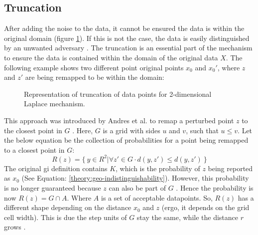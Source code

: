 \subsection{Truncation} \label{theory:truncation}
After adding the noise to the data, it cannot be ensured the data is within the original domain (figure \ref{figure:truncation-2d}).
If this is not the case, the data is easily distinguished by an unwanted adversary \citep{DBLP:journals/corr/abs-1212-1984,9646489}.
The truncation is an essential part of the mechanism to ensure the data is contained within the domain of the original data $X$. The following example shows two different point original points $x_0$ and $x_0'$, where $z$ and $z'$ are being remapped to be within the domain:
\begin{figure}[H]
\centering
  
  \caption{Representation of truncation of data points for 2-dimensional Laplace mechanism.}
  \label{figure:truncation-2d}
\end{figure}
This approach was introduced by Andres et al. to remap a perturbed point $z$ to the closest point in $G$ \citep{DBLP:journals/corr/abs-1212-1984}.
Here, $G$ is a grid with sides $u$ and $v$, such that $u \leq v$.
Let the below equation be the collection of probabilities for a point being remapped to a closest point in $G$:
\begin{equation}
  R(z) = \{ \ y \in R^2 | \forall z' \in G \cdot d(y, z') \leq d(y, z') \ \}
  \label{eq:grid-probability}
\end{equation}
The original \gls{gi} definition contains $K$, which is the probability of $z$ being reported as $x_0$ (See Equation: \ref{theory:geo-indistinguishability}).
However, this probability is no longer guaranteed because $z$ can also be part of $G$ \citep{DBLP:journals/corr/abs-1212-1984}.
Hence the probability is now $R(z) = G \cap A$. Where $A$ is a set of acceptable datapoints.\newline
So, $R(z)$ has a different shape depending on the distance $x_0$ and $z$ (ergo, it depends on the grid cell width). This is due the step units of $G$ stay the same, while the distance $r$ grows \citep{DBLP:journals/corr/abs-1212-1984}.

